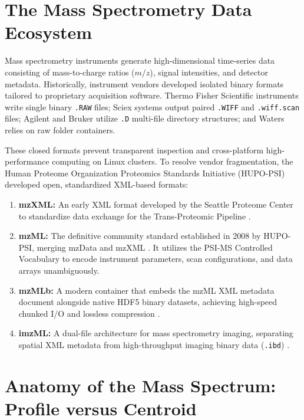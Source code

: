 \documentclass[11pt,twoside,openright]{book}
\begin{document}
\section{The Mass Spectrometry Data Ecosystem}
\label{sec:data_ecosystem}

Mass spectrometry instruments generate high-dimensional time-series data consisting of mass-to-charge ratios ($m/z$), signal intensities, and detector metadata. Historically, instrument vendors developed isolated binary formats tailored to proprietary acquisition software. Thermo Fisher Scientific instruments write single binary \texttt{.RAW} files; Sciex systems output paired \texttt{.WIFF} and \texttt{.wiff.scan} files; Agilent and Bruker utilize \texttt{.D} multi-file directory structures; and Waters relies on raw folder containers.

These closed formats prevent transparent inspection and cross-platform high-performance computing on Linux clusters. To resolve vendor fragmentation, the Human Proteome Organization Proteomics Standards Initiative (HUPO-PSI) developed open, standardized XML-based formats:
\begin{enumerate}
    \item \textbf{mzXML:} An early XML format developed by the Seattle Proteome Center to standardize data exchange for the Trans-Proteomic Pipeline \cite{pedrioli2004mzxml}.
    \item \textbf{mzML:} The definitive community standard established in 2008 by HUPO-PSI, merging mzData and mzXML \cite{martens2011mzml, deutsch2010psi}. It utilizes the PSI-MS Controlled Vocabulary to encode instrument parameters, scan configurations, and data arrays unambiguously.
    \item \textbf{mzMLb:} A modern container that embeds the mzML XML metadata document alongside native HDF5 binary datasets, achieving high-speed chunked I/O and lossless compression \cite{bhamber2021mzmlb}.
    \item \textbf{imzML:} A dual-file architecture for mass spectrometry imaging, separating spatial XML metadata from high-throughput imaging binary data (\texttt{.ibd}) \cite{schramm2012imzml}.
\end{enumerate}

\section{Anatomy of the Mass Spectrum: Profile versus Centroid}
\label{sec:profile_vs_centroid}
\end{document}
